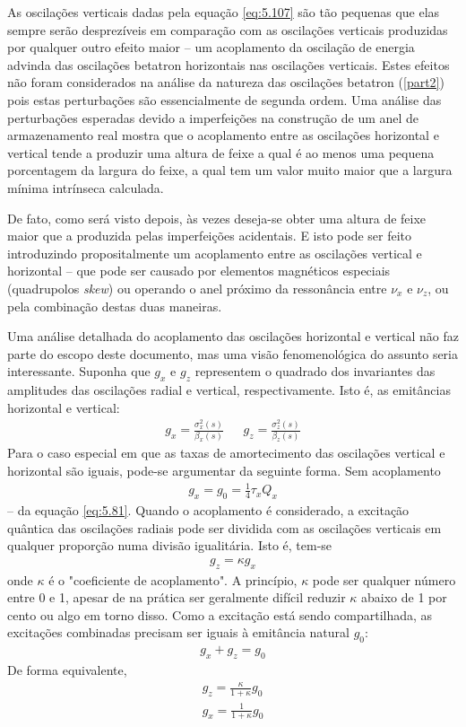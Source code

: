 As oscilações verticais dadas pela equação \eqref{eq:5.107} são tão pequenas que elas sempre serão desprezíveis em comparação com as oscilações verticais produzidas por qualquer outro efeito maior -- um acoplamento da oscilação de energia advinda das oscilações betatron horizontais nas oscilações verticais. Estes efeitos não foram considerados na análise da natureza das oscilações betatron (\autoref{part2}) pois estas perturbações são essencialmente de segunda ordem. Uma análise das perturbações esperadas devido a imperfeições na construção de um anel de armazenamento real mostra que o acoplamento entre as oscilações horizontal e vertical tende a produzir uma altura de feixe a qual é ao menos uma pequena porcentagem da largura do feixe, a qual tem um valor muito maior que a largura mínima intrínseca calculada.

De fato, como será visto depois, às vezes deseja-se obter uma altura de feixe maior que a produzida pelas imperfeições acidentais. E isto pode ser feito introduzindo propositalmente um acoplamento entre as oscilações vertical e horizontal -- que pode ser causado por elementos magnéticos especiais (quadrupolos \textit{skew}) ou operando o anel próximo da ressonância entre $\nu_x$ e $\nu_z$, ou pela combinação destas duas maneiras.

Uma análise detalhada do acoplamento das oscilações horizontal e vertical não faz parte do escopo deste documento, mas uma visão fenomenológica do assunto seria interessante. Suponha que $g_x$ e $g_z$ representem o quadrado dos invariantes das amplitudes das oscilações radial e vertical, respectivamente. Isto é, as emitâncias horizontal e vertical:
\begin{align}
	g_x = \frac{\sigma_x^2(s)}{\beta_x(s)}\ \ \ \ \ \ \ g_z = \frac{\sigma_z^2(s)}{\beta_z(s)}\label{eq:5.109}
\end{align}
Para o caso especial em que as taxas de amortecimento das oscilações vertical e horizontal são iguais, pode-se argumentar da seguinte forma. Sem acoplamento
\begin{align}
	g_x = g_0 = \frac{1}{4} \tau_x Q_x
\end{align}
-- da equação \eqref{eq:5.81}. Quando o acoplamento é considerado, a excitação quântica das oscilações radiais pode ser dividida com as oscilações verticais em qualquer proporção numa divisão igualitária. Isto é, tem-se
\begin{align}
	g_z = \kappa g_x
\end{align}
onde $\kappa$ é o "coeficiente de acoplamento". A princípio, $\kappa$ pode ser qualquer número entre 0 e 1, apesar de na prática ser geralmente difícil reduzir $\kappa$ abaixo de 1 por cento ou algo em torno disso. Como a excitação está sendo compartilhada, as excitações combinadas precisam ser iguais à emitância natural $g_0$:
\begin{align}
	g_x + g_z = g_0
\end{align}
De forma equivalente,
\begin{align}
	g_z = \frac{\kappa}{1+\kappa}g_0 \nonumber \\
	g_x = \frac{1}{1+\kappa}g_0
\end{align}

